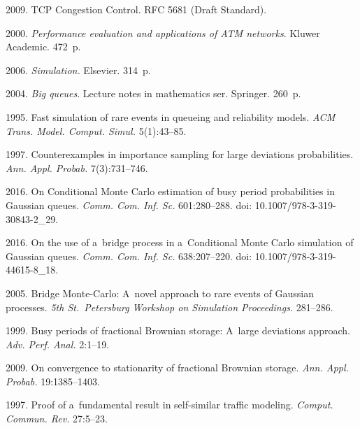 \begin{multicols}{2}
{{\begin{thebibliography}{99}
 2009. TCP Congestion Control.
{RFC 5681 (Draft Standard).}

 2000. 
\textit{Performance evaluation and applications of ATM networks}. Kluwer Academic. 
472~p.

 2006. \textit{Simulation.} Elsevier. 314~p.

 2004. 
\textit{Big queues}. Lecture notes in mathematics ser. Springer. 260~p.

 1995. Fast simulation of rare events in queueing 
and reliability models. \textit{ACM Trans. Model. Comput. Simul.} 5(1):43--85.

1997. Counterexamples in importance sampling for large deviations probabilities. 
\textit{Ann. Appl. Probab.} 7(3):731--746.

 2016. 
On Conditional Monte Carlo estimation of busy period probabilities in 
Gaussian queues. \textit{Comm.
Com. Inf. Sc.} 601:280--288. doi: 10.1007/978-3-319-30843-2\_29.

2016. On the use of a~bridge process in a~Conditional Monte Carlo simulation of 
Gaussian queues. \textit{Comm. Com.  Inf. Sc.} 638:207--220. 
doi: 10.1007/978-3-319-44615-8\_18.

 2005. Bridge Monte-Carlo: 
A~novel approach to rare events of Gaussian processes. 
\textit{5th St.\ Petersburg Workshop on Simulation Proceedings.} 281--286.

 1999. Busy periods of fractional Brownian storage: 
A~large deviations approach. \textit{Adv. Perf. Anal.} 2:1--19.

 2009. 
On convergence to stationarity of fractional Brownian storage. 
\textit{Ann. Appl. Probab.} 19:1385--1403.



 1997. 
Proof of a~fundamental result in self-similar traffic modeling. 
\textit{Comput. Commun. Rev.} 27:5--23.


\end{thebibliography}}}
\end{multicols}
